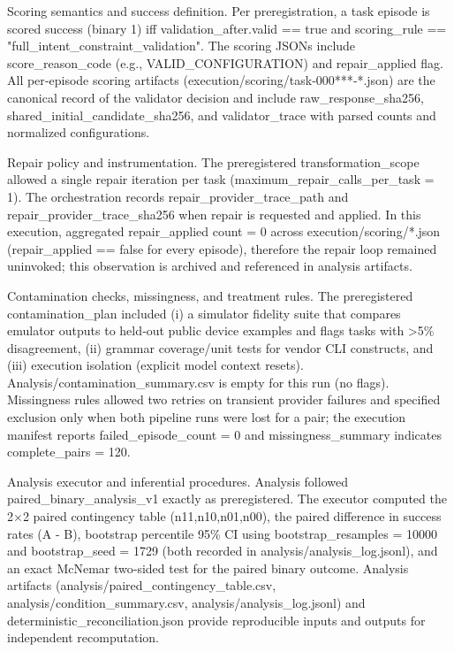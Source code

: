 \documentclass[conference]{IEEEtran}
\begin{document}
Scoring semantics and success definition. Per preregistration, a task episode is scored success (binary 1) iff validation\_after.valid == true and scoring\_rule == "full\_intent\_constraint\_validation". The scoring JSONs include score\_reason\_code (e.g., VALID\_CONFIGURATION) and repair\_applied flag. All per‑episode scoring artifacts (execution/scoring/task‑000***‑*.json) are the canonical record of the validator decision and include raw\_response\_sha256, shared\_initial\_candidate\_sha256, and validator\_trace with parsed counts and normalized configurations.

Repair policy and instrumentation. The preregistered transformation\_scope allowed a single repair iteration per task (maximum\_repair\_calls\_per\_task = 1). The orchestration records repair\_provider\_trace\_path and repair\_provider\_trace\_sha256 when repair is requested and applied. In this execution, aggregated repair\_applied count = 0 across execution/scoring/*.json (repair\_applied == false for every episode), therefore the repair loop remained uninvoked; this observation is archived and referenced in analysis artifacts.

Contamination checks, missingness, and treatment rules. The preregistered contamination\_plan included (i) a simulator fidelity suite that compares emulator outputs to held‑out public device examples and flags tasks with >5\% disagreement, (ii) grammar coverage/unit tests for vendor CLI constructs, and (iii) execution isolation (explicit model context resets). Analysis/contamination\_summary.csv is empty for this run (no flags). Missingness rules allowed two retries on transient provider failures and specified exclusion only when both pipeline runs were lost for a pair; the execution manifest reports failed\_episode\_count = 0 and missingness\_summary indicates complete\_pairs = 120.

Analysis executor and inferential procedures. Analysis followed paired\_binary\_analysis\_v1 exactly as preregistered. The executor computed the 2\ensuremath{\times}2 paired contingency table (n11,n10,n01,n00), the paired difference in success rates (A - B), bootstrap percentile 95\% CI using bootstrap\_resamples = 10000 and bootstrap\_seed = 1729 (both recorded in analysis/analysis\_log.jsonl), and an exact McNemar two‑sided test for the paired binary outcome. Analysis artifacts (analysis/paired\_contingency\_table.csv, analysis/condition\_summary.csv, analysis/analysis\_log.jsonl) and deterministic\_reconciliation.json provide reproducible inputs and outputs for independent recomputation.
\end{document}
